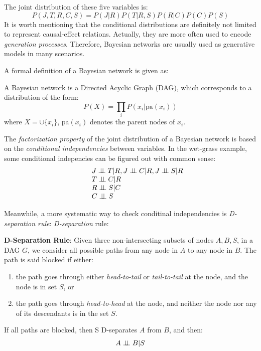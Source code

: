 The joint distribution of these five variables is:
\begin{equation}
	P(J,T,R,C,S)=P(J|R)P(T|R,S)P(R|C)P(C)P(S)
	\label{equ:wet_grass}
\end{equation}
It is worth mentioning that the conditional distributions are definitely not limited to represent causal-effect relations.  
Actually, they are more often used to encode \emph{generation processes}. Therefore, Bayesian networks are usually 
used as generative models in many scenarios.  

A formal definition of a Bayesian network is given as:  
\begin{definition}
 A Bayesian network is a Directed Acyclic Graph (DAG), which corresponds to a distribution of the form:
 \begin{equation}
  P(X)=\prod_i P(x_i|\text{pa}(x_i))
 \end{equation}
where $X=\cup\{x_i\}$, pa$(x_i)$ denotes the parent nodes of $x_i$. 
\end{definition}

The \emph{factorization property} of the joint distribution of a Bayesian network is based on the \emph{conditional independencies} between variables. In the wet-grass example, some conditional 
indepencies can be figured out with common sense:
\begin{equation*}
\begin{array}{rcl}
 &&J\ci T|R, J\ci C|R, J\ci S|R\\
 &&T\ci C|R \\
 &&R\ci S|C \\
 &&C\ci S 
\end{array}
\end{equation*}
 

Meanwhile, a more systematic way to check conditinal independencies is \emph{D-separation rule}: 
\emph{D-separation} rule:  
\begin{theorem}
\textbf{D-Separation Rule}:
 Given three non-intersecting subsets of nodes $A,B,S$, in a DAG $G$, we consider all possible paths from any node in $A$ to any node in $B$. The path 
is said blocked if either: 
\begin{enumerate}
 \item the path goes through either \emph{head-to-tail} or \emph{tail-to-tail} at the node, and the node is in set $S$, or
 \item the path goes through \emph{head-to-head} at the node, and neither the node nor any of its descendants is in the set $S$. 
\end{enumerate}
If all paths are blocked, then S D-separates $A$ from $B$, and then:
\begin{equation*}
 A\perp\!\!\!\perp B|S
\end{equation*}
\end{theorem}

